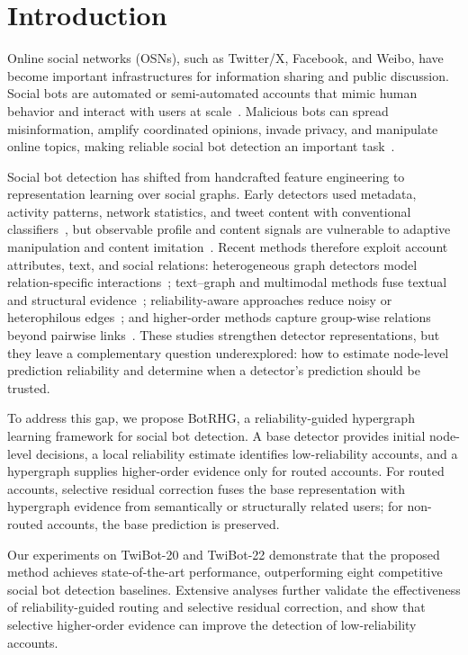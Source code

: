 \section{Introduction}\label{sec:introduction}

Online social networks (OSNs), such as Twitter/X, Facebook, and Weibo, have become important infrastructures for information sharing and public discussion. Social bots are automated or semi-automated accounts that mimic human behavior and interact with users at scale~\cite{ferrara2016rise}. Malicious bots can spread misinformation, amplify coordinated opinions, invade privacy, and manipulate online topics, making reliable social bot detection an important task~\cite{feng2021twibot20,twibot22benchmark}.

Social bot detection has shifted from handcrafted feature engineering to representation learning over social graphs. Early detectors used metadata, activity patterns, network statistics, and tweet content with conventional classifiers~\cite{davis2016botornot,varol2017online,bot_hunter2018,friendbot2020}, but observable profile and content signals are vulnerable to adaptive manipulation and content imitation~\cite{cresci2017paradigm}. Recent methods therefore exploit account attributes, text, and social relations: heterogeneous graph detectors model relation-specific interactions~\cite{feng2021botrgcn,feng2022rgt}; text--graph and multimodal methods fuse textual and structural evidence~\cite{lei2023bic,liu2023botmoe,zhou2024lgb}; reliability-aware approaches reduce noisy or heterophilous edges~\cite{qiao2025bece,lin2025botbr}; and higher-order methods capture group-wise relations beyond pairwise links~\cite{gao2025higherorder,yang2024sebot}. These studies strengthen detector representations, but they leave a complementary question underexplored: how to estimate node-level prediction reliability and determine when a detector's prediction should be trusted.

To address this gap, we propose BotRHG, a reliability-guided hypergraph learning framework for social bot detection. A base detector provides initial node-level decisions, a local reliability estimate identifies low-reliability accounts, and a hypergraph supplies higher-order evidence only for routed accounts. For routed accounts, selective residual correction fuses the base representation with hypergraph evidence from semantically or structurally related users; for non-routed accounts, the base prediction is preserved.

Our experiments on TwiBot-20 and TwiBot-22 demonstrate that the proposed method achieves state-of-the-art performance, outperforming eight competitive social bot detection baselines. Extensive analyses further validate the effectiveness of reliability-guided routing and selective residual correction, and show that selective higher-order evidence can improve the detection of low-reliability accounts.

